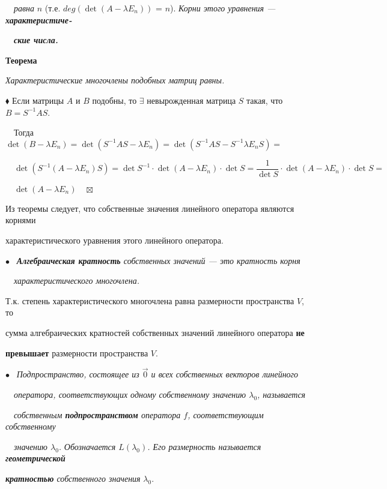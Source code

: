 \documentclass[a4paper, 12pt]{report}
\begin{document}
	$\quad$\textit{равна} $n$ (т.е. $deg(\det(A - \lambda E_n))$ = $n$). \textit{Корни этого уравнения --- \textbf{характеристиче-}}
	
	$\quad$\textit{\textbf{ские числа.}}
	
	\par\bigskip
	\textbf{Теорема}
	
	\textit{Характеристические многочлены подобных матриц равны.}
	\par\bigskip
	$\blacklozenge$ Если матрицы $A$ и $B$ подобны, то $\exists$ невырожденная матрица $S$ такая, что $B = S^{-1}AS$.
	
	$\quad$Тогда $\det(B - \lambda E_n) = \det(S^{-1}AS - \lambda E_n) = \det(S^{-1}AS - S^{-1}\lambda E_n S) =$
	
	$\quad \det(S^{-1}(A - \lambda E_n)S) = \det S^{-1} \cdot \det(A - \lambda E_n) \cdot  \det S = \dfrac1{\det S} \cdot \det(A - \lambda E_n) \cdot \det S =$
	
	$\quad \det(A - \lambda E_n) \quad \boxtimes$
	\par\bigskip
	Из теоремы следует, что собственные значения линейного оператора являются корнями 
	
	характеристического уравнения этого линейного оператора.
	\par\bigskip
	$\bullet$ \ \textit{\textbf{Алгебраическая кратность} собственных значений --- это кратность корня}
	
	$\quad$\textit{характеристического многочлена.}
	
	\par\bigskip
	Т.к. степень характеристического многочлена равна размерности пространства $V$, то 
	
	сумма алгебраических кратностей собственных значений линейного оператора \textbf{не}
	
	\textbf{превышает} размерности пространства $V$.
	\par\bigskip
	$\bullet$ \ \textit{Подпространство, состоящее из $\overrightarrow{0}$ и всех собственных векторов линейного}
	
	$\quad$\textit{оператора, соответствующих одному собственному значению $\lambda_0$, называется}
	
	$\quad$\textit{собственным \textbf{подпространством} оператора $f$, соответствующим собственному}
	
	$\quad$\textit{значению $\lambda_0$.} \textit{Обозначается $L(\lambda_0)$. Его размерность называется \textbf{геометрической} }
	
	\quad\textit{\textbf{кратностью} собственного значения }$\lambda_0$.
	
\end{document}
